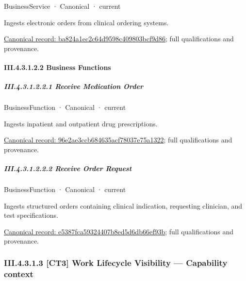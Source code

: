 \label{element:ba824a1ec2c64d9598c409803bcf9d86}
{\small BusinessService · Canonical · current}\par

Ingests electronic orders from clinical ordering systems.


{\footnotesize \href{../../../../../../../continuum/business/business-service/ba824a1ec2c64d9598c409803bcf9d86.md}{Canonical record: ba824a1ec2c64d9598c409803bcf9d86}; full qualifications and provenance.}\par
\paragraph*{III.4.3.1.2.2 Business Functions}
\label{navigation:III.4.3.1.2.2}

\subparagraph*{III.4.3.1.2.2.1 Receive Medication Order}
\label{navigation:III.4.3.1.2.2.1}

\label{element:96e2ae3ccb684635acf78037e75a1322}
{\small BusinessFunction · Canonical · current}\par

Ingests inpatient and outpatient drug prescriptions.


{\footnotesize \href{../../../../../../../continuum/business/business-function/96e2ae3ccb684635acf78037e75a1322.md}{Canonical record: 96e2ae3ccb684635acf78037e75a1322}; full qualifications and provenance.}\par
\subparagraph*{III.4.3.1.2.2.2 Receive Order Request}
\label{navigation:III.4.3.1.2.2.2}

\label{element:e5387fca59324407b8ed5d6db66ef93b}
{\small BusinessFunction · Canonical · current}\par

Ingests structured orders containing clinical indication, requesting clinician, and test specifications.


{\footnotesize \href{../../../../../../../continuum/business/business-function/e5387fca59324407b8ed5d6db66ef93b.md}{Canonical record: e5387fca59324407b8ed5d6db66ef93b}; full qualifications and provenance.}\par
\subsubsection*{III.4.3.1.3 [CT3] Work Lifecycle Visibility — Capability context}
\label{navigation:III.4.3.1.3}

